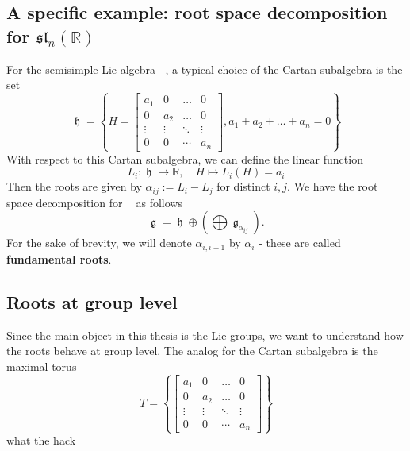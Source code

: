 \documentclass[12pt]{article} %
\DeclareMathOperator{\fg}{\mathfrak{g}}
\DeclareMathOperator{\fh}{\mathfrak{h}}
\DeclareMathOperator{\slnr}{\mathfrak{sl}_n(\mathbb{R})}
\begin{document}
\subsection{A specific example: root space decomposition for $\mathfrak{sl}_n(\mathbb{R})$}
For the semisimple Lie algebra $\slnr$, a typical choice of the Cartan subalgebra is the set 
\[\fh = \left\lbrace H= \begin{bmatrix}
    a_1 &  0 & \ldots & 0 \\
    0 &  a_2 & \ldots & 0 \\
    \vdots & \vdots    &\ddots & \vdots\\
    0 & 0 & \cdots & a_n
\end{bmatrix}, a_1 + a_2+ \ldots + a_n = 0\right\rbrace\]
With respect to this Cartan subalgebra, we can define the linear function 
\[L_i \colon \fh \to \mathbb{R}, \quad H \mapsto L_i(H)= a_i\]
Then the roots are given by $\alpha_{ij} :=L_i - L_j$ for distinct $i,j$. We have the root space decomposition for $\slnr$ as follows
\[\fg = \fh \oplus \left(\bigoplus\fg_{\alpha_{ij}}\right).\]
For the sake of brevity, we will denote $\alpha_{i,i+1}$ by $\alpha_i$ - these are called \textbf{fundamental roots}.
\subsection{Roots at group level}
Since the main object in this thesis is the Lie groups, we want to understand how the roots 
behave at group level. The analog for the Cartan subalgebra is the maximal torus 
\[T = \left\lbrace \begin{bmatrix}
    a_1 &  0 & \ldots & 0 \\
    0 &  a_2 & \ldots & 0 \\
    \vdots & \vdots    &\ddots & \vdots\\
    0 & 0 & \cdots & a_n
\end{bmatrix} \right\rbrace \]
what the hack
\end{document}
